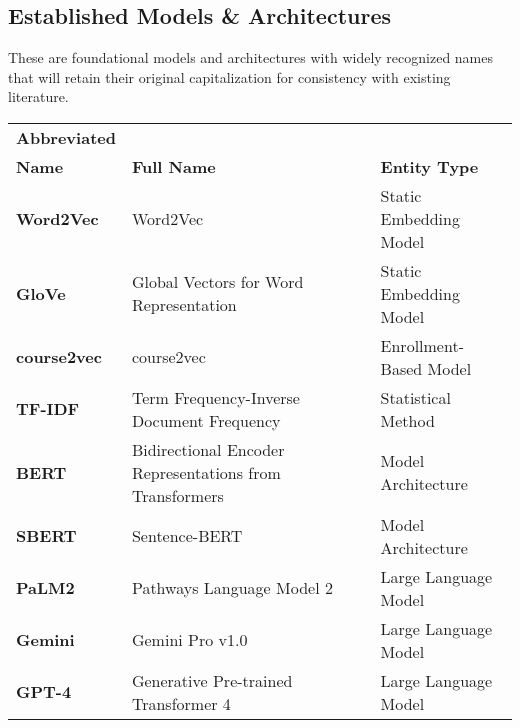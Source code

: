 \documentclass[11pt]{article}
\begin{document}
\subsection*{Established Models \& Architectures}
These are foundational models and architectures with widely recognized names that will retain their original capitalization for consistency with existing literature.
\begin{table}[h!]
\centering
\begin{tabular}{@{}lp{}p{}@{}}
\toprule
\textbf{Abbreviated} &                                       &          \\ 
\textbf{Name} & \textbf{Full Name}                                      & \textbf{Entity Type}         \\ \midrule
\textbf{Word2Vec}         & Word2Vec                                                & Static Embedding Model     \\
\textbf{GloVe}            & Global Vectors for Word Representation                  & Static Embedding Model     \\
\textbf{course2vec}       & course2vec                                              & Enrollment-Based Model     \\
\textbf{TF-IDF}           & Term Frequency-Inverse Document Frequency               & Statistical Method         \\
\textbf{BERT}             & Bidirectional Encoder Representations from Transformers & Model Architecture         \\
\textbf{SBERT}            & Sentence-BERT                                           & Model Architecture         \\
\textbf{PaLM2}            & Pathways Language Model 2                               & Large Language Model       \\
\textbf{Gemini}           & Gemini Pro v1.0                                         & Large Language Model       \\
\textbf{GPT-4}            & Generative Pre-trained Transformer 4                    & Large Language Model       \\ \bottomrule
\end{tabular}
\end{table}
\end{document}
